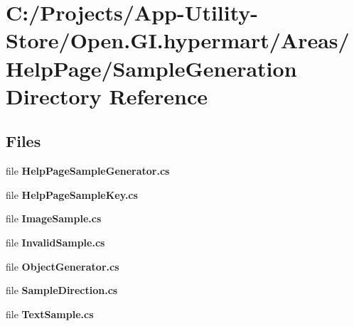 \section{C\+:/\+Projects/\+App-\/\+Utility-\/\+Store/\+Open.G\+I.\+hypermart/\+Areas/\+Help\+Page/\+Sample\+Generation Directory Reference}
\label{dir_72c27a3633ac5def3756a9351e62a72c}
\subsection*{Files}
\begin{DoxyCompactItemize}
\item 
file \textbf{ Help\+Page\+Sample\+Generator.\+cs}
\item 
file \textbf{ Help\+Page\+Sample\+Key.\+cs}
\item 
file \textbf{ Image\+Sample.\+cs}
\item 
file \textbf{ Invalid\+Sample.\+cs}
\item 
file \textbf{ Object\+Generator.\+cs}
\item 
file \textbf{ Sample\+Direction.\+cs}
\item 
file \textbf{ Text\+Sample.\+cs}
\end{DoxyCompactItemize}
